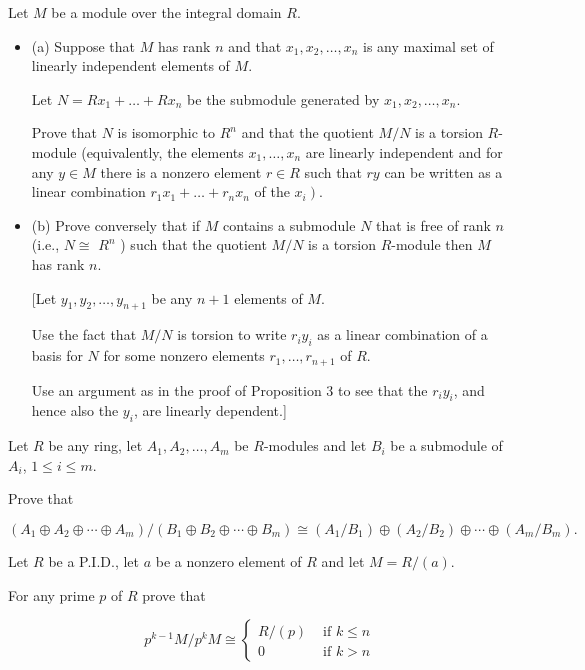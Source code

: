 Let $M$ be a module over the integral domain $R$.
\begin{itemize}
    \item (a) Suppose that $M$ has rank $n$ and that $x_1, x_2, \ldots, x_n$ is any maximal set of linearly independent elements of $M$.

Let $N=R x_1+\ldots+R x_n$ be the submodule generated by $x_1, x_2, \ldots, x_n$.

Prove that $N$ is isomorphic to $R^n$ and that the quotient $M / N$ is a torsion $R$-module (equivalently, the elements $x_1, \ldots, x_n$ are linearly independent and for any $y \in M$ there is a nonzero element $r \in R$ such that $r y$ can be written as a linear combination $r_1 x_1+\ldots+r_n x_n$ of the $\left.x_i\right)$.

    \item (b) Prove conversely that if $M$ contains a submodule $N$ that is free of rank $n$ (i.e., $N \cong$ $R^n$ ) such that the quotient $M / N$ is a torsion $R$-module then $M$ has rank $n$.

[Let $y_1, y_2, \ldots, y_{n+1}$ be any $n+1$ elements of $M$.

Use the fact that $M / N$ is torsion to write $r_i y_i$ as a linear combination of a basis for $N$ for some nonzero elements $r_1, \ldots, r_{n+1}$ of $R$.

Use an argument as in the proof of Proposition 3 to see that the $r_i y_i$, and hence also the $y_i$, are linearly dependent.]

\end{itemize}

Let $R$ be any ring, let $A_1, A_2, \ldots, A_m$ be $R$-modules and let $B_i$ be a submodule of $A_i$, $1 \leq i \leq m$.

Prove that

$$
\left(A_1 \oplus A_2 \oplus \cdots \oplus A_m\right) /\left(B_1 \oplus B_2 \oplus \cdots \oplus B_m\right) \cong\left(A_1 / B_1\right) \oplus\left(A_2 / B_2\right) \oplus \cdots \oplus\left(A_m / B_m\right) \text {.
}
$$

Let $R$ be a P.I.D., let $a$ be a nonzero element of $R$ and let $M=R /(a)$.

For any prime $p$ of $R$ prove that

$$
p^{k-1} M / p^k M \cong \begin{cases}R /(p) & \text { if } k \leq n \\ 0 & \text { if } k>n\end{cases}
$$

